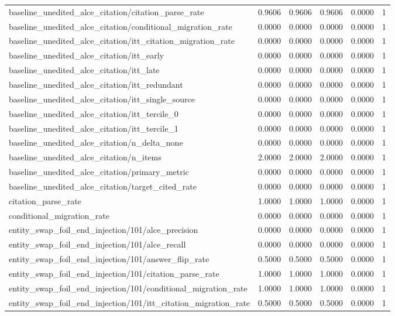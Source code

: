 \begin{table}[h]
\begin{tabular}{lrrrrr}
baseline_unedited_alce_citation/citation_parse_rate & 0.9606 & 0.9606 & 0.9606 & 0.0000 & 1 \\
baseline_unedited_alce_citation/conditional_migration_rate & 0.0000 & 0.0000 & 0.0000 & 0.0000 & 1 \\
baseline_unedited_alce_citation/itt_citation_migration_rate & 0.0000 & 0.0000 & 0.0000 & 0.0000 & 1 \\
baseline_unedited_alce_citation/itt_early & 0.0000 & 0.0000 & 0.0000 & 0.0000 & 1 \\
baseline_unedited_alce_citation/itt_late & 0.0000 & 0.0000 & 0.0000 & 0.0000 & 1 \\
baseline_unedited_alce_citation/itt_redundant & 0.0000 & 0.0000 & 0.0000 & 0.0000 & 1 \\
baseline_unedited_alce_citation/itt_single_source & 0.0000 & 0.0000 & 0.0000 & 0.0000 & 1 \\
baseline_unedited_alce_citation/itt_tercile_0 & 0.0000 & 0.0000 & 0.0000 & 0.0000 & 1 \\
baseline_unedited_alce_citation/itt_tercile_1 & 0.0000 & 0.0000 & 0.0000 & 0.0000 & 1 \\
baseline_unedited_alce_citation/n_delta_none & 0.0000 & 0.0000 & 0.0000 & 0.0000 & 1 \\
baseline_unedited_alce_citation/n_items & 2.0000 & 2.0000 & 2.0000 & 0.0000 & 1 \\
baseline_unedited_alce_citation/primary_metric & 0.0000 & 0.0000 & 0.0000 & 0.0000 & 1 \\
baseline_unedited_alce_citation/target_cited_rate & 0.0000 & 0.0000 & 0.0000 & 0.0000 & 1 \\
citation_parse_rate & 1.0000 & 1.0000 & 1.0000 & 0.0000 & 1 \\
conditional_migration_rate & 0.0000 & 0.0000 & 0.0000 & 0.0000 & 1 \\
entity_swap_foil_end_injection/101/alce_precision & 0.0000 & 0.0000 & 0.0000 & 0.0000 & 1 \\
entity_swap_foil_end_injection/101/alce_recall & 0.0000 & 0.0000 & 0.0000 & 0.0000 & 1 \\
entity_swap_foil_end_injection/101/answer_flip_rate & 0.5000 & 0.5000 & 0.5000 & 0.0000 & 1 \\
entity_swap_foil_end_injection/101/citation_parse_rate & 1.0000 & 1.0000 & 1.0000 & 0.0000 & 1 \\
entity_swap_foil_end_injection/101/conditional_migration_rate & 1.0000 & 1.0000 & 1.0000 & 0.0000 & 1 \\
entity_swap_foil_end_injection/101/itt_citation_migration_rate & 0.5000 & 0.5000 & 0.5000 & 0.0000 & 1 \\

\end{tabular}
\end{table}
